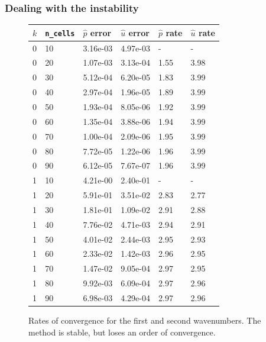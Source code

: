 \documentclass[8pt]{beamer}
\begin{document}
\begin{frame}
    \frametitle{Dealing with the instability}
    \begin{figure}
        \centering
        \begin{tabular}{| l | l | l | l | l | l |}
            \hline
            \(k\) & \texttt{n\_cells} &
            \(\hat{p}\) error & \(\hat{u}\) error &
            \(\hat{p}\) rate & \(\hat{u}\) rate                               \\
            \hline
            0 & 10 & 3.16e-03 & 4.97e-03 & -    & -                           \\
            0 & 20 & 1.07e-03 & 3.13e-04 & 1.55 & 3.98                        \\
            0 & 30 & 5.12e-04 & 6.20e-05 & 1.83 & 3.99                        \\
            0 & 40 & 2.97e-04 & 1.96e-05 & 1.89 & 3.99                        \\
            0 & 50 & 1.93e-04 & 8.05e-06 & 1.92 & 3.99                        \\
            0 & 60 & 1.35e-04 & 3.88e-06 & 1.94 & 3.99                        \\
            0 & 70 & 1.00e-04 & 2.09e-06 & 1.95 & 3.99                        \\
            0 & 80 & 7.72e-05 & 1.22e-06 & 1.96 & 3.99                        \\
            0 & 90 & 6.12e-05 & 7.67e-07 & 1.96 & 3.99                        \\
            \hline
            1 & 10 & 4.21e-00 & 2.40e-01 & -    & -                           \\
            1 & 20 & 5.91e-01 & 3.51e-02 & 2.83 & 2.77                        \\
            1 & 30 & 1.81e-01 & 1.09e-02 & 2.91 & 2.88                        \\
            1 & 40 & 7.76e-02 & 4.71e-03 & 2.94 & 2.91                        \\
            1 & 50 & 4.01e-02 & 2.44e-03 & 2.95 & 2.93                        \\
            1 & 60 & 2.33e-02 & 1.42e-03 & 2.96 & 2.95                        \\
            1 & 70 & 1.47e-02 & 9.05e-04 & 2.97 & 2.95                        \\
            1 & 80 & 9.92e-03 & 6.09e-04 & 2.97 & 2.96                        \\
            1 & 90 & 6.98e-03 & 4.29e-04 & 2.97 & 2.96                        \\
            \hline
        \end{tabular}

        \caption{Rates of convergence for the first and second wavenumbers. The
        method is stable, but loses an order of convergence.}
    \end{figure}
\end{frame}
\end{document}
